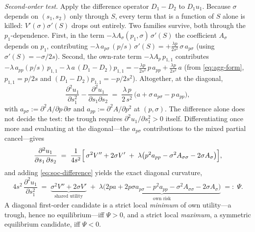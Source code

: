 \emph{Second-order test.} Apply the difference operator $D_1 - D_2$
to $D_1 u_1$. Because $\sigma$ depends on $(s_1,s_2)$ only through
$S$, every term that is a function of $S$ alone is killed:
$V'(\sigma)\sigma'(S)$ drops out entirely. Two families survive,
both through the $p_1$-dependence. First, in the term $-\lambda
A_\sigma(p_1,\sigma)\,\sigma'(S)$ the coefficient $A_\sigma$ depends
on $p_1$, contributing $-\lambda\,a_{p\sigma}\,(p/s)\,\sigma'(S) =
+\tfrac{\lambda p}{2s^2}\,\sigma\, a_{p\sigma}$ (using $\sigma'(S) =
-\sigma/2s$). Second, the own-rate term $-\lambda A_p\, p_{1,1}$
contributes $-\lambda\,a_{pp}(p/s)\,p_{1,1} -
\lambda\,a\,(D_1-D_2)p_{1,1} =
-\tfrac{\lambda p}{2s^2}\,p\,a_{pp} + \tfrac{\lambda p}{2s^2}\,a$
(from \eqref{eq:agg-form}, $p_{1,1} = p/2s$ and $(D_1-D_2)p_{1,1} =
-p/2s^2$). Altogether, at the diagonal,
\begin{equation}
\frac{\partial^2 u_1}{\partial s_1^2}
-\frac{\partial^2 u_1}{\partial s_1 \partial s_2}
\;=\; \frac{\lambda\, p}{2\, s^2}\,\bigl(a + \sigma\, a_{p\sigma}
      - p\, a_{pp}\bigr),
\label{eq:soc-difference}
\end{equation}
with $a_{p\sigma} := \partial^2 A/\partial p\,\partial\sigma$ and
$a_{pp} := \partial^2 A/\partial p^2$ at $(p,\sigma)$. The difference
alone does not decide the test: the trough requires $\partial^2
u_1/\partial s_1^2 > 0$ itself. Differentiating once more and
evaluating at the diagonal---the $a_{p\sigma}$ contributions to the
mixed partial cancel---gives
\begin{equation}
\frac{\partial^2 u_1}{\partial s_1\,\partial s_2}
\;=\; \frac{1}{4 s^2}\Bigl[\,\sigma^2 V'' + 2\sigma V'
   \;+\; \lambda\bigl(p^2 a_{pp} - \sigma^2 A_{\sigma\sigma}
   - 2\sigma A_\sigma\bigr)\Bigr],
\label{eq:mixed-diagonal}
\end{equation}
and adding \eqref{eq:soc-difference} yields the exact diagonal
curvature,
\begin{equation}
4 s^2\,\frac{\partial^2 u_1}{\partial s_1^2}
\;=\; \underbrace{\sigma^2 V'' + 2\sigma V'}_{\textrm{shared
utility}}
\;+\; \lambda\underbrace{\bigl(2 p a + 2 p \sigma a_{p\sigma}
      - p^2 a_{pp} - \sigma^2 A_{\sigma\sigma}
      - 2 \sigma A_\sigma\bigr)}_{\textrm{own risk}}
\;=:\; \Psi.
\label{eq:diag-curvature}
\end{equation}
A diagonal first-order candidate is a strict local \emph{minimum}
of own utility---a trough, hence no equilibrium---iff $\Psi > 0$,
and a strict local \emph{maximum}, a symmetric equilibrium
candidate, iff $\Psi < 0$.

